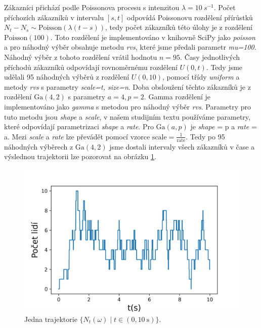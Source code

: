 \documentclass[czech]{mvi-report}
\begin{document}
Zákazníci přichází podle Poissonova procesu s intenzitou $ \lambda = 10~s^{-1} $. Počet příchozích zákazníků v intervalu $ [s,t] $ odpovídá Poissonovu rozdělení přírůstků $ N_t - N_s \sim \textrm{Poisson}(\lambda (t-s)) $, tedy počet zákazníků této úlohy je z rozdělení $ \textrm{Poisson}(100) $. Toto rozdělení je implementováno v knihovně SciPy jako \textit{poisson} a pro náhodný výběr obsahuje metodu \textit{rvs}, které jsme předali parametr \textit{mu=100}. Náhodný výběr z tohoto rozdělení vrátil hodnotu $  n=95 $. Časy jednotlivých příchodů zákazníků odpovídají rovnoměrnému rozdělení $ U(0,t) $. Tedy jsme udělali 95 náhodných výběrů z rozdělení $ U(0,10) $, pomocí třídy \textit{uniform} a metody \textit{rvs} s parametry \textit{scale=t, size=n}. Doba obsloužení těchto zákazníků je z rozdělení $\mathrm{Ga}(4,2)$ s parametry $ a = 4, p = 2 $. Gamma rozdělení je implementováno jako \textit{gamma} s metodou pro náhodný výběr \textit{rvs}. Parametry pro tuto metodu jsou \textit{shape} a \textit{scale}, v našem studijním textu používáme parametry, které odpovídají parametrizaci \textit{shape} a \textit{rate}. Pro $ \mathrm{Ga}(a,p) $ je \textit{shape} = p a \textit{rate} = a. Mezi \textit{scale} a \textit{rate} lze převádět pomocí vzorce $\mathrm{scale}=\frac{1}{\mathrm{rate}} $. Tedy po 95 náhodných výběrech z $\mathrm{Ga}(4,2)$ jsme dostali intervaly všech zákazníků v čase a výslednou trajektorii lze pozorovat na obrázku \ref{fig:traj}.

\begin{figure}
\includegraphics[width=\columnwidth]{img/traj.png} 
\caption{Jedna trajektorie $ \{N_t(\omega) \mid t\in(0,10~\mathrm{s})\} $.}
\label{fig:traj}
\end{figure}
\end{document}
